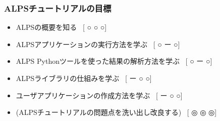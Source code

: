\begin{frame}
  \frametitle{ALPSチュートリアルの目標}
  \begin{itemize}
    \setlength{\itemsep}{1em}
    \item ALPSの概要を知る \ [{\footnotesize\color{red} ○}{\footnotesize\color{blue} ○}{\footnotesize\color{green} ○}]
    \item ALPSアプリケーションの実行方法を学ぶ  \ [{\footnotesize\color{red} ○}{\footnotesize\color{blue} ー}{\footnotesize\color{green} ○}]
    \item ALPS Pythonツールを使った結果の解析方法を学ぶ  \ [{\footnotesize\color{red} ○}{\footnotesize\color{blue} ー}{\footnotesize\color{green} ○}]
    \item ALPSライブラリの仕組みを学ぶ \ [{\footnotesize\color{red} ー}{\footnotesize\color{blue} ○}{\footnotesize\color{green} ○}]
    \item ユーザアプリケーションの作成方法を学ぶ  \ [{\footnotesize\color{red} ー}{\footnotesize\color{blue} ○}{\footnotesize\color{green} ○}]
    \item (ALPSチュートリアルの問題点を洗い出し改良する) \ [{\footnotesize\color{red} ◎}{\footnotesize\color{blue} ◎}{\footnotesize\color{green} ◎}] 
  \end{itemize}
\end{frame}

